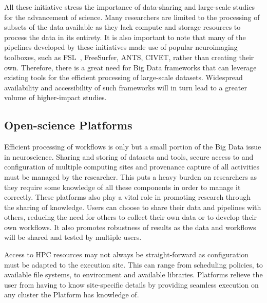             All these initiative stress the importance of data-sharing and
            large-scale studies for the advancement of science. Many researchers
            are limited to the processing of subsets of the data available as
            they lack compute and storage resources to process the data in its
            entirety. It is also important to note that many of the pipelines
            developed by these initiatives made use of popular neuroimaging
            toolboxes, such as FSL~\cite{SMITH2004S208}, FreeSurfer, ANTS,
            CIVET, rather than creating their own. Therefore, there is a great
            need for Big Data frameworks that can leverage existing tools for
            the efficient processing of large-scale datasets. Widespread
            availability and accessibility of such frameworks will in turn lead
            to a greater volume of higher-impact studies.


        \subsection{Open-science Platforms}\label{platforms} Efficient
            processing of workflows is only but a small portion of the Big Data
            issue in neuroscience.
            Sharing and storing of datasets and tools, secure access to and
            configuration of multiple computing sites and provenance capture of
            all activities must be managed by the researcher. This puts a heavy
            burden on researchers as they require some knowledge of all these
            components in order to manage it correctly. These platforms also
            play a vital role in promoting research through the sharing of
            knowledge. Users can choose to share their data and pipelines with
            others, reducing the need for others to collect their own data or to
            develop their own workflows. It also promotes robustness of results
            as the data and workflows will be shared and tested by multiple
            users.

            Access to HPC resources may not always be straight-forward as
            configuration must be adapted to the execution site. This can range
            from scheduling policies, to available file systems, to environment
            and available libraries. Platforms relieve the user from having to
            know site-specific details by providing seamless execution on any
            cluster the Platform has knowledge of.

